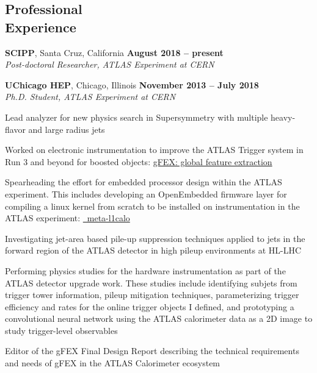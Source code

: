 \documentclass[margin,line]{resume}
\let\origsection\section%
\let\section\subsection%
\let\section\origsection%
\begin{document}
\begin{resume}
\section{\mysidestyle Professional\\Experience}

\textbf{SCIPP}, Santa Cruz, California \hfill \textbf{August 2018 -- present}\\
\textsl{Post-doctoral Researcher, ATLAS Experiment at CERN}

\textbf{UChicago HEP}, Chicago, Illinois \hfill \textbf{November 2013 -- July 2018}\\
\textsl{Ph.D. Student, ATLAS Experiment at CERN}
\begin{list2}
\item Lead analyzer for new physics search in Supersymmetry with multiple heavy-flavor and large radius jets \cite{SUSY-2016-10, SUSY-2015-10, ATLAS-CONF-2017-021, ATLAS-CONF-2016-052, ATLAS-CONF-2015-067}
\item Worked on electronic instrumentation to improve the ATLAS Trigger system in Run 3 and beyond for boosted objects: \href{https://gfex.cern.ch/}{gFEX: global feature extraction} \cite{Tang:2104248, DPF2017gFEX}
  \item Spearheading the effort for embedded processor design within the ATLAS experiment. This includes developing an OpenEmbedded firmware layer for compiling a linux kernel from scratch to be installed on instrumentation in the ATLAS experiment: \href{https://github.com/kratsg/meta-l1calo}{~meta-l1calo}
  \item Investigating jet-area based pile-up suppression techniques applied to jets in the forward region of the ATLAS detector in high pileup environments at HL-LHC \cite{HFSF2017}
  \item Performing physics studies for the hardware instrumentation as part of the ATLAS detector upgrade work. These studies include identifying subjets from trigger tower information, pileup mitigation techniques, parameterizing trigger efficiency and rates for the online trigger objects I defined, and prototyping a convolutional neural network using the ATLAS calorimeter data as a 2D image to study trigger-level observables \cite{DPF2017gFEX}
  \item Editor of the gFEX Final Design Report describing the technical requirements and needs of gFEX in the ATLAS Calorimeter ecosystem \cite{Begel:2233958}

\end{list2}
\end{resume}
\end{document}
